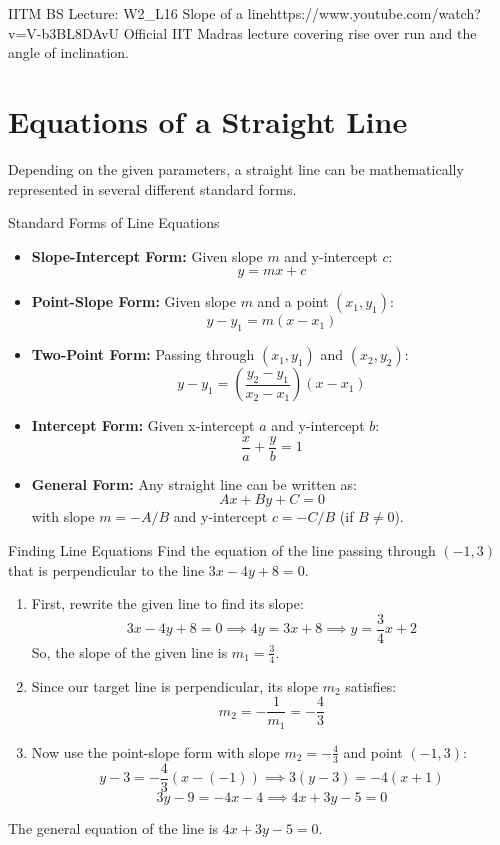 \begin{videocard}{IITM BS Lecture: W2\_L16 Slope of a line}{https://www.youtube.com/watch?v=V-b3BL8DAvU}
Official IIT Madras lecture covering rise over run and the angle of inclination.
\end{videocard}

\section{Equations of a Straight Line}

Depending on the given parameters, a straight line can be mathematically represented in several different standard forms.

\begin{definitionbox}{Standard Forms of Line Equations}
\begin{itemize}
    \item \textbf{Slope-Intercept Form:} Given slope $m$ and y-intercept $c$:
    $$y = mx + c$$
    \item \textbf{Point-Slope Form:} Given slope $m$ and a point $(x_1, y_1)$:
    $$y - y_1 = m(x - x_1)$$
    \item \textbf{Two-Point Form:} Passing through $(x_1, y_1)$ and $(x_2, y_2)$:
    $$y - y_1 = \left( \frac{y_2 - y_1}{x_2 - x_1} \right) (x - x_1)$$
    \item \textbf{Intercept Form:} Given x-intercept $a$ and y-intercept $b$:
    $$\frac{x}{a} + \frac{y}{b} = 1$$
    \item \textbf{General Form:} Any straight line can be written as:
    $$Ax + By + C = 0$$
    with slope $m = -A/B$ and y-intercept $c = -C/B$ (if $B \neq 0$).
\end{itemize}
\end{definitionbox}

\begin{examplebox}{Finding Line Equations}
Find the equation of the line passing through $(-1, 3)$ that is perpendicular to the line $3x - 4y + 8 = 0$.
\begin{enumerate}
    \item First, rewrite the given line to find its slope:
    $$3x - 4y + 8 = 0 \implies 4y = 3x + 8 \implies y = \frac{3}{4}x + 2$$
    So, the slope of the given line is $m_1 = \frac{3}{4}$.
    \item Since our target line is perpendicular, its slope $m_2$ satisfies:
    $$m_2 = -\frac{1}{m_1} = -\frac{4}{3}$$
    \item Now use the point-slope form with slope $m_2 = -\frac{4}{3}$ and point $(-1, 3)$:
    $$y - 3 = -\frac{4}{3}(x - (-1)) \implies 3(y - 3) = -4(x + 1)$$
    $$3y - 9 = -4x - 4 \implies 4x + 3y - 5 = 0$$
\end{enumerate}
The general equation of the line is $4x + 3y - 5 = 0$.
\end{examplebox}

